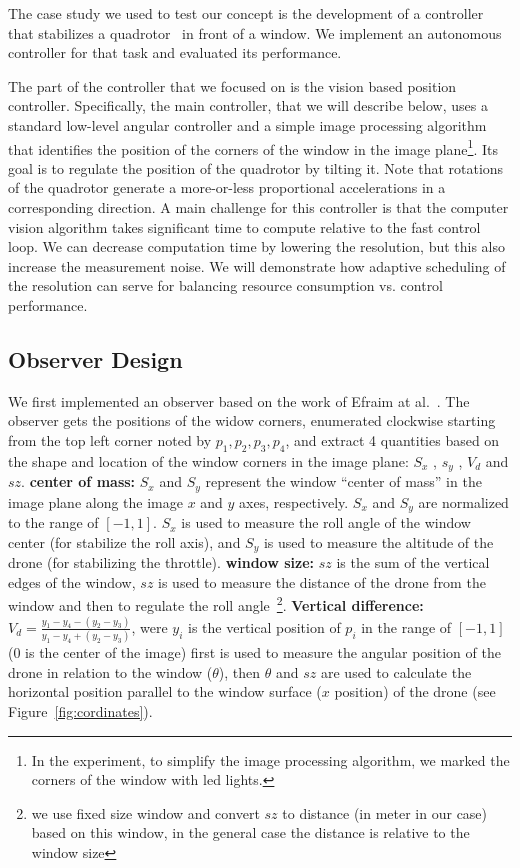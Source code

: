 \documentclass{sig-alternate-ipsn13}
\begin{document}
The case study we used to test our concept is the development of a controller that stabilizes a quadrotor~\cite{?} in front of a window.
We implement an autonomous controller for that task and evaluated its performance.

The part of the controller that we focused on is the vision based position controller. Specifically, the main controller, that we will describe below, uses a standard low-level angular controller and a simple image processing algorithm that identifies the position of the corners of the window in the image plane\footnote{In the experiment, to simplify the image processing algorithm, we marked the corners of the window with led lights.}. Its goal is to regulate the position of the quadrotor by tilting it. Note that rotations of the quadrotor generate a more-or-less proportional accelerations in a corresponding direction. A main challenge for this controller is that the computer vision algorithm takes significant time to compute relative to the fast control loop. We can decrease computation time by lowering the resolution, but this also increase the measurement noise. We will demonstrate how adaptive scheduling of the resolution can serve for balancing resource consumption vs. control performance.

\subsection{Observer Design}
\label{sec:Observer Design}
We first implemented an observer based on the work of Efraim at al.~\cite{?? Dynamic Image Based Visual Servo Control of Micro Aerial Vehicles Relative to a Window}. The observer gets the positions of the widow corners, enumerated clockwise starting from the top left corner noted by $p_1,p_2,p_3,p_4$, and extract 4 quantities based on the shape and location of the window corners in the image plane: $S_x$ , $s_y$ , $V_d$ and $sz$.
\textbf{center of mass:} $S_x$ and $S_y$ represent the window ``center of mass'' in the image plane along the image $x$ and $y$ axes, respectively. $S_x$ and $S_y$ are normalized to the range of $[-1,1]$.
$S_x$ is used to measure the roll angle of the window center (for stabilize the roll axis), and $S_y$ is used to measure the altitude of the drone (for stabilizing the throttle).
\textbf{window size:} $sz$ is the sum of the vertical edges of the window, $sz$ is used to measure the distance of the drone from the window and then to regulate the roll angle~\footnote{we use fixed size window and convert $sz$ to distance (in meter in our case) based on this window, in the general case the distance is relative to the window size}.
\textbf{Vertical difference:} $V_d = \frac{y_1-y_4-(y_2-y_3)}{y_1-y_4+(y_2-y_3)}$, were $y_i$ is the vertical position of $p_i$ in the range of $[-1,1]$ (0 is the center of the image) first is used to measure the angular position of the drone in relation to the window ($\theta$), then $\theta$ and $sz$ are used to calculate the horizontal position parallel to the window surface ($x$ position) of the drone (see Figure~\ref{fig:cordinates}). 
\end{document}

